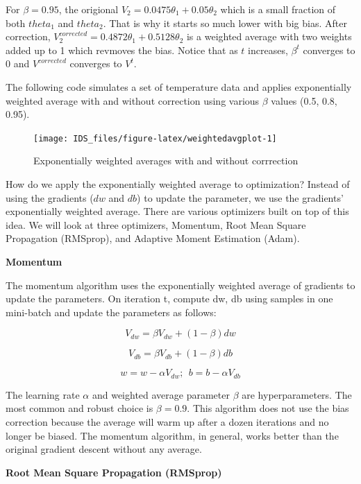 \documentclass[
  12pt,
]{krantz}
\begin{document}
For \(\beta = 0.95\), the origional \(V_2 = 0.0475\theta_{1}+0.05\theta_{2}\) which is a small fraction of both \(theta_1\) and \(theta_2\). That is why it starts so much lower with big bias. After correction, \(V_{2}^{corrected} = 0.4872\theta_{1}+0.5128\theta_{2}\) is a weighted average with two weights added up to 1 which revmoves the bias. Notice that as \(t\) increases, \(\beta^t\) converges to 0 and \(V^{corrected}\) converges to \(V^t\).

The following code simulates a set of temperature data and applies exponentially weighted average with and without correction using various \(\beta\) values (0.5, 0.8, 0.95).

\begin{figure}

{\centering \texttt{[image: IDS\_files/figure-latex/weightedavgplot-1]} 

}

\caption{Exponentially weighted averages with and without corrrection}\label{fig:weightedavgplot}
\end{figure}

How do we apply the exponentially weighted average to optimization? Instead of using the gradients (\(dw\) and \(db\)) to update the parameter, we use the gradients' exponentially weighted average. There are various optimizers built on top of this idea. We will look at three optimizers, Momentum, Root Mean Square Propagation (RMSprop), and Adaptive Moment Estimation (Adam).

\textbf{Momentum}

The momentum algorithm uses the exponentially weighted average of gradients to update the parameters. On iteration t, compute dw, db using samples in one mini-batch and update the parameters as follows:

\[V_{dw} = \beta V_{dw}+(1-\beta)dw\]

\[V_{db} = \beta V_{db}+(1-\beta)db\]

\[w=w-\alpha V_{dw};\ \ b=b-\alpha V_{db}\]

The learning rate \(\alpha\) and weighted average parameter \(\beta\) are hyperparameters. The most common and robust choice is \(\beta = 0.9\). This algorithm does not use the bias correction because the average will warm up after a dozen iterations and no longer be biased. The momentum algorithm, in general, works better than the original gradient descent without any average.

\textbf{Root Mean Square Propagation (RMSprop)}
\end{document}
